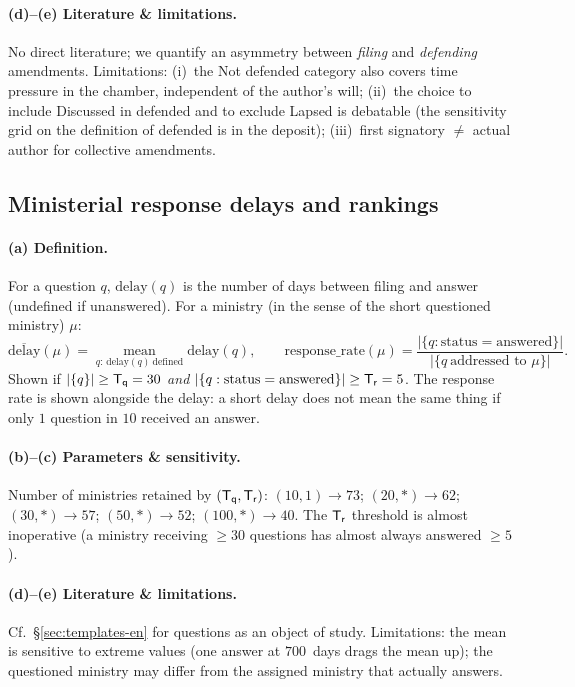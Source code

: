 \paragraph{(d)--(e) Literature \& limitations.} No direct literature; we quantify an
asymmetry between \emph{filing} and \emph{defending} amendments. Limitations:
(i)~the \og{}Not defended\fg{} category also covers time pressure in the chamber,
independent of the author's will; (ii)~the choice to include \og{}Discussed\fg{}
in \og{}defended\fg{} and to exclude \og{}Lapsed\fg{} is debatable (the sensitivity
grid on the definition of \og{}defended\fg{} is in the deposit); (iii)~\og{}first
signatory\fg{} $\ne$ \og{}actual author\fg{} for collective amendments.

\subsection{Ministerial response delays and rankings}\label{sec:delais-en}

\paragraph{(a) Definition.} For a question $q$, $\mathrm{delay}(q)$ is the number of
days between filing and answer (undefined if unanswered). For a ministry (in the
sense of the short \og{}questioned ministry\fg{}) $\mu$:
\[
\overline{\mathrm{delay}}(\mu)=\operatorname*{mean}_{q:\,\mathrm{delay}(q)\ \text{defined}}\mathrm{delay}(q),\qquad
\mathrm{response\_rate}(\mu)=\frac{|\{q:\text{status}=\text{answered}\}|}{|\{q\ \text{addressed to }\mu\}|}.
\]
Shown if $|\{q\}|\ge \mathsf{T_q}=30$ \emph{and} $|\{q:\text{status}=\text{answered}\}|\ge \mathsf{T_r}=5$.
The response rate is shown alongside the delay: a short delay does not mean the same
thing if only $1$ question in $10$ received an answer.

\paragraph{(b)--(c) Parameters \& sensitivity.} Number of ministries retained by
$(\mathsf{T_q},\mathsf{T_r})$: $(10,1)\to 73$; $(20,*)\to 62$; $(30,*)\to 57$;
$(50,*)\to 52$; $(100,*)\to 40$. The $\mathsf{T_r}$ threshold is almost inoperative
(a ministry receiving $\ge 30$ questions has almost always answered $\ge 5$).

\paragraph{(d)--(e) Literature \& limitations.} Cf.~§\ref{sec:templates-en} for
questions as an object of study. Limitations: the mean is sensitive to extreme
values (one answer at $700$~days drags the mean up); the \og{}questioned
ministry\fg{} may differ from the \og{}assigned ministry\fg{} that actually
answers.

